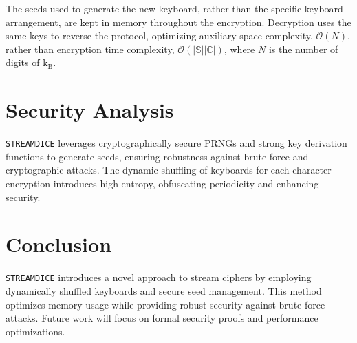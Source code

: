 \documentclass{article}
\begin{document}
The seeds used to generate the new keyboard, rather than the specific keyboard arrangement, are kept in memory throughout the encryption. Decryption uses the same keys to reverse the protocol, optimizing auxiliary space complexity, $\mathcal{O}(N)$, rather than encryption time complexity, $\mathcal{O}(|\mathbb{S}||\mathbb{C}|)$, where $N$ is the number of digits of $\mathrm{k_B}$.

\section{Security Analysis}
\texttt{STREAMDICE} leverages cryptographically secure PRNGs and strong key derivation functions to generate seeds, ensuring robustness against brute force and cryptographic attacks. The dynamic shuffling of keyboards for each character encryption introduces high entropy, obfuscating periodicity and enhancing security.

\section{Conclusion}
\texttt{STREAMDICE} introduces a novel approach to stream ciphers by employing dynamically shuffled keyboards and secure seed management. This method optimizes memory usage while providing robust security against brute force attacks. Future work will focus on formal security proofs and performance optimizations.
\end{document}
